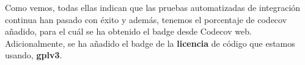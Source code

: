 Como vemos, todas ellas indican que las pruebas automatizadas de integración continua han
pasado con éxito y además, tenemos el porcentaje de codecov añadido, para el cuál se ha
obtenido el badge desde Codecov web. Adicionalmente, se ha añadido el badge de la
\textbf{licencia} de código que estamos usando, \textbf{gplv3}.